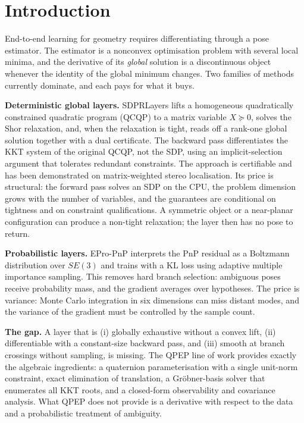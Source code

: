 \section{Introduction}\label{sec:intro}

End-to-end learning for geometry requires differentiating through a pose estimator. The estimator is a nonconvex optimisation problem with several local minima, and the derivative of its \emph{global} solution is a discontinuous object whenever the identity of the global minimum changes. Two families of methods currently dominate, and each pays for what it buys.

\textbf{Deterministic global layers.} SDPRLayers \cite{holmes2025sdpr} lifts a homogeneous quadratically constrained quadratic program (QCQP) to a matrix variable $X\succeq0$, solves the Shor relaxation, and, when the relaxation is tight, reads off a rank-one global solution together with a dual certificate. The backward pass differentiates the KKT system of the original QCQP, not the SDP, using an implicit-selection argument that tolerates redundant constraints. The approach is certifiable and has been demonstrated on matrix-weighted stereo localisation. Its price is structural: the forward pass solves an SDP on the CPU, the problem dimension grows with the number of variables, and the guarantees are conditional on tightness and on constraint qualifications. A symmetric object or a near-planar configuration can produce a non-tight relaxation; the layer then has no pose to return.

\textbf{Probabilistic layers.} EPro-PnP \cite{chen2022epropnp} interprets the PnP residual as a Boltzmann distribution over $SE(3)$ and trains with a KL loss using adaptive multiple importance sampling. This removes hard branch selection: ambiguous poses receive probability mass, and the gradient averages over hypotheses. The price is variance: Monte Carlo integration in six dimensions can miss distant modes, and the variance of the gradient must be controlled by the sample count.

\textbf{The gap.} A layer that is (i) globally exhaustive without a convex lift, (ii) differentiable with a constant-size backward pass, and (iii) smooth at branch crossings without sampling, is missing. The QPEP line of work \cite{wu2022qpep} provides exactly the algebraic ingredients: a quaternion parameterisation with a single unit-norm constraint, exact elimination of translation, a Gr\"obner-basis solver that enumerates all KKT roots, and a closed-form observability and covariance analysis. What QPEP does not provide is a derivative with respect to the data and a probabilistic treatment of ambiguity.

